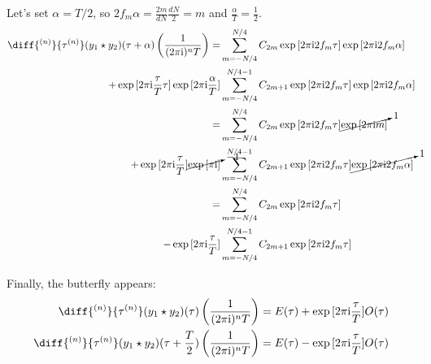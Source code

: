 \documentclass[12pt]{article}
\newenvironment{derivation}[1][Derivation]{\begin{trivlist}
\item[\hskip \labelsep {\bfseries #1:}]}{\end{trivlist}}
\begin{document}
\begin{derivation}
Let's set $\alpha = T/2$, so $2 f_m \alpha = \frac{2m}{dN} \frac{dN}{2} = m$ and $\frac{\alpha}{T} = \frac{1}{2}$.
\begin{align}
\diff{^{(n)}}{\tau^{(n)}} (y_1 \star y_2)(\tau+\alpha) \left(\frac{1}{(\twopii)^{n} T}\right) = & \sum_{m = -N/4}^{N/4} C_{2m} \exp{[\twopii 2 f_m \tau]} \exp{[\twopii 2 f_m \alpha]} \\
+ \exp{[\twopii \frac{\tau}{T}\tau]} \exp{[\twopii \frac{\alpha}{T}]} & \sum_{m = -N/4}^{N/4-1} C_{2m+1} \exp{[\twopii 2 f_m \tau]} \exp{[\twopii 2 f_m \alpha]} \\
= & \sum_{m = -N/4}^{N/4} C_{2m} \exp{[\twopii 2 f_m \tau]} \cancelto{1}{\exp{[\twopii m]}} \\
+ \exp{[\twopii \frac{\tau}{T}]} \cancelto{-1}{\exp{[\pii]}} & \sum_{m = -N/4}^{N/4-1} C_{2m+1} \exp{[\twopii 2 f_m \tau]} \cancelto{1}{\exp{[\twopii 2 f_m \alpha]}} \\
= & \sum_{m = -N/4}^{N/4} C_{2m} \exp{[\twopii 2 f_m \tau]} \\
- \exp{[\twopii \frac{\tau}{T}]} & \sum_{m = -N/4}^{N/4-1} C_{2m+1} \exp{[\twopii 2 f_m \tau]}
\end{align}

Finally, the butterfly appears:
\begin{align}
\diff{^{(n)}}{\tau^{(n)}} (y_1 \star y_2)(\tau) \left(\frac{1}{(\twopii)^{n} T}\right) & = E(\tau) + \exp{[\twopii \frac{\tau}{T}]} O(\tau) \\
\diff{^{(n)}}{\tau^{(n)}} (y_1 \star y_2)(\tau+\frac{T}{2}) \left(\frac{1}{(\twopii)^{n} T}\right) & = E(\tau) - \exp{[\twopii \frac{\tau}{T}]} O(\tau)
\end{align}



\end{derivation}
\end{document}
